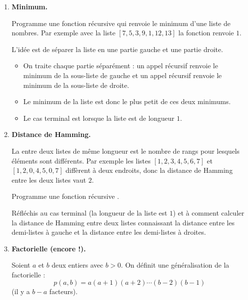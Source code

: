\documentclass[11pt,class=report,crop=false]{standalone}
\begin{document}
\begin{activite}
   

\begin{enumerate}
  \item \textbf{Minimum.}
  
  Programme une fonction récursive  qui renvoie le minimum d'une liste de nombres.
  Par exemple avec la liste $[7,5,3,9,1,12,13]$ la fonction renvoie $1$.
  
  L'idée est de séparer la liste en une partie gauche et une partie droite. 
  \begin{itemize}
    \item On traite chaque partie séparément : un appel récursif renvoie le minimum de la sous-liste de gauche et un appel récursif renvoie le minimum de la sous-liste de droite. 
     
    \item Le minimum de la liste est donc le plus petit de ces deux minimums.
    
    \item Le cas terminal est lorsque la liste est de longueur $1$.
  \end{itemize}
    
  \item \textbf{Distance de Hamming.} 
  
  La  entre deux listes de même longueur est le nombre de rangs pour lesquels éléments sont différents.
  Par exemple les listes $[1,2,3,4,5,6,7]$ et $[1,2,0,4,5,0,7]$ diffèrent à deux endroits, donc la distance de Hamming entre les deux listes vaut $2$.
  
  Programme une fonction récursive .
  
  Réfléchis au cas terminal (la longueur de la liste est $1$) et à comment calculer la distance de Hamming entre deux listes connaissant la distance entre les demi-listes à gauche et la distance entre les demi-listes à droites.
  
  \item \textbf{Factorielle (encore !).}
  
  Soient $a$ et $b$ deux entiers avec $b>0$. 
  On définit une généralisation de la factorielle :
  $$p(a,b) = a(a+1)(a+2)\cdots (b-2)(b-1)$$
  (il y a $b-a$ facteurs).
  

\end{enumerate}
\end{activite}
\end{document}
